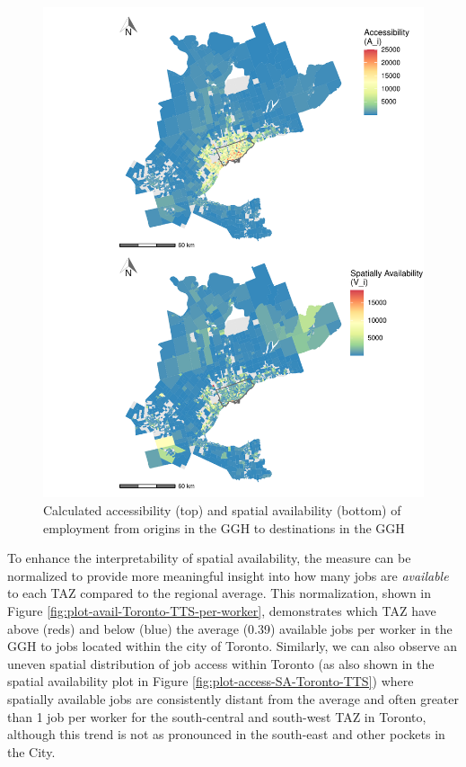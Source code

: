 \documentclass[]{elsarticle} %
\begin{document}
\begin{figure}
\includegraphics[width=1\linewidth]{Spatial-Availability_files/figure-latex/plot-access-SA-GGH-TTS-1} \caption{\label{fig:plot-access-SA-GGH-TTS}Calculated accessibility (top) and spatial availability (bottom) of employment from origins in the GGH to destinations in the GGH}\label{fig:plot-access-SA-GGH-TTS}
\end{figure}

\newpage

To enhance the interpretability of spatial availability, the measure can
be normalized to provide more meaningful insight into how many jobs are
\emph{available} to each TAZ compared to the regional average. This
normalization, shown in Figure
\ref{fig:plot-avail-Toronto-TTS-per-worker}, demonstrates which TAZ have
above (reds) and below (blue) the average (0.39) available jobs per
worker in the GGH to jobs located within the city of Toronto. Similarly,
we can also observe an uneven spatial distribution of job access within
Toronto (as also shown in the spatial availability plot in Figure
\ref{fig:plot-access-SA-Toronto-TTS}) where spatially available jobs are
consistently distant from the average and often greater than 1 job per
worker for the south-central and south-west TAZ in Toronto, although
this trend is not as pronounced in the south-east and other pockets in
the City.
\end{document}
